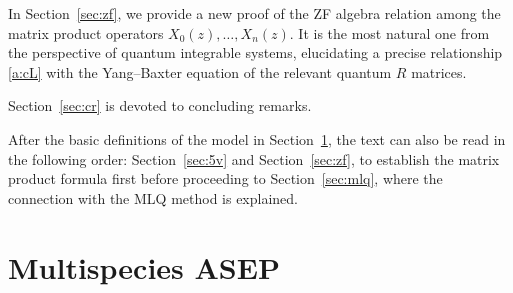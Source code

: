 In Section~\ref{sec:zf}, we provide a new proof of 
the ZF algebra relation among the matrix product operators $X_0(z), \ldots, X_n(z)$.
It is the most natural one from the perspective of quantum integrable systems, 
elucidating a precise relationship \eqref{a:cL} with the Yang--Baxter equation of the relevant quantum $R$ matrices.

Section~\ref{sec:cr} is devoted to concluding remarks.

After the basic definitions of the model in Section~\ref{sec:asep}, 
the text can also be read in the following order: 
Section~\ref{sec:5v} and  Section~\ref{sec:zf}, 
to establish the matrix product formula first before proceeding 
to Section~\ref{sec:mlq}, where the connection with the MLQ method is explained.


\section{Multispecies ASEP}\label{sec:asep}

